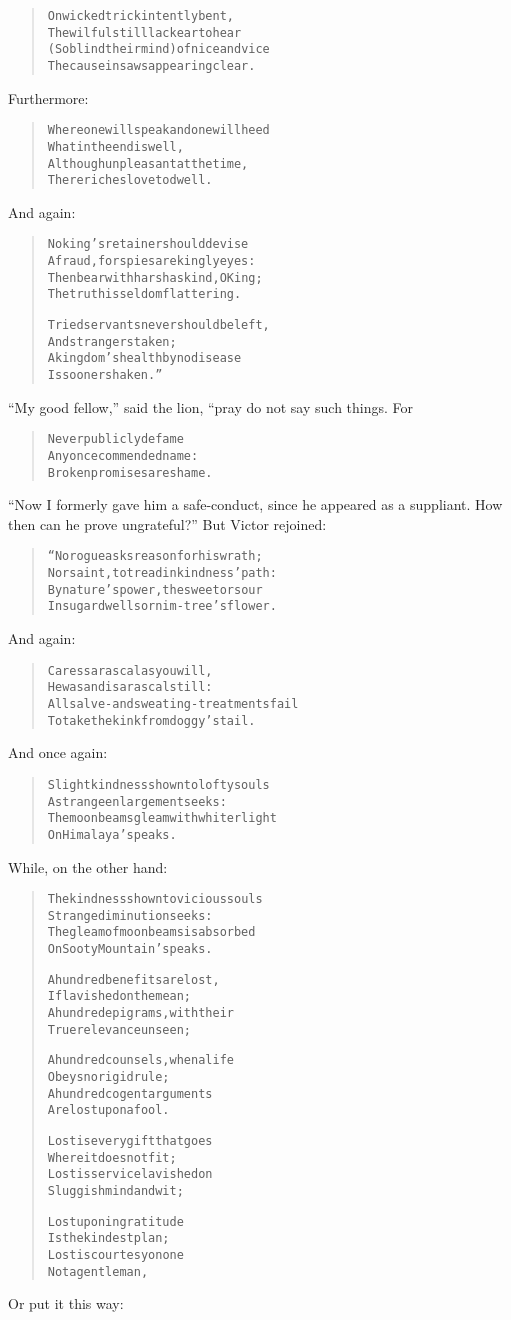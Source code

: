 \documentclass[article, twoside, 14pt]{memoir}
\renewenvironment{verbatim}{%
\begin{quote}%
\vskip -10pt%
\begin{alltt}\normalfont\large}{\end{alltt}%
\end{quote}%
\vskip -10pt
} %
\begin{document}
\begin{verbatim}
On wicked trick intently bent,
    The wilful still lack ear to hear
(So blind their mind) of nice and vice
    The cause in saws appearing clear.
\end{verbatim}
Furthermore:

\begin{verbatim}
Where one will speak and one will heed
    What in the end is well,
Although unpleasant at the time,
    There riches love to dwell.
\end{verbatim}
And again:

\begin{verbatim}
No king's retainer should devise
A fraud, for spies are kingly eyes:
Then bear with harsh as kind, O King;
The truth is seldom flattering.

Tried servants never should be left,
    And strangers taken;
A kingdom's health by no disease
    Is sooner shaken.”
\end{verbatim}
``My good fellow,'' said the lion, “pray do not say such things.
For

\begin{verbatim}
Never publicly defame
Any once commended name:
Broken promises are shame.
\end{verbatim}
``Now I formerly gave him a safe-conduct, since he appeared as a suppliant. How then can he prove ungrateful?''
But Victor rejoined:

\begin{verbatim}
“No rogue asks reason for his wrath;
Nor saint, to tread in kindness' path:
By nature's power, the sweet or sour
In sugar dwells or nim-tree's flower.
\end{verbatim}
And again:

\begin{verbatim}
Caress a rascal as you will,
He was and is a rascal still:
All salve- and sweating-treatments fail
To take the kink from doggy's tail.
\end{verbatim}
And once again:

\begin{verbatim}
Slight kindness shown to lofty souls
A strange enlargement seeks:
The moonbeams gleam with whiter light
On Himalaya's peaks.
\end{verbatim}
While, on the other hand:

\begin{verbatim}
The kindness shown to vicious souls
    Strange diminution seeks:
The gleam of moonbeams is absorbed
    On Sooty Mountain's peaks.

A hundred benefits are lost,
    If lavished on the mean;
A hundred epigrams, with their
    True relevance unseen;

A hundred counsels, when a life
    Obeys no rigid rule;
A hundred cogent arguments
    Are lost upon a fool.

Lost is every gift that goes
    Where it does not fit;
Lost is service lavished on
    Sluggish mind and wit;

Lost upon ingratitude
    Is the kindest plan;
Lost is courtesy on one
    Not a gentleman,
\end{verbatim}
Or put it this way:
\end{document}
